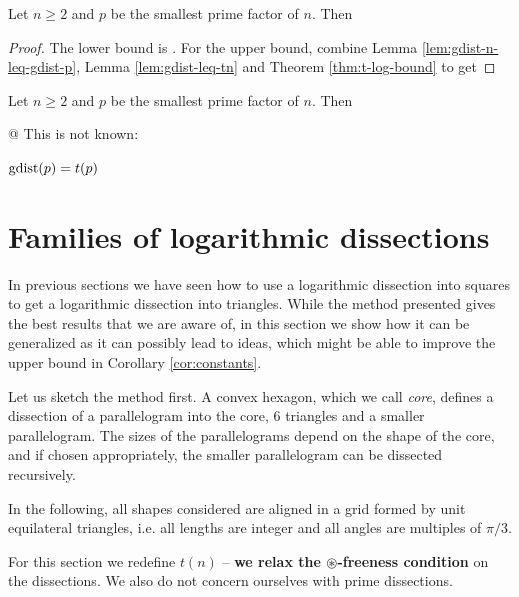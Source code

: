 
\begin{cor}
\label{cor:conj-proof}
Let $n \geq 2$ and $p$ be the smallest prime factor of $n$. Then
\end{cor}%
\begin{proof}
The lower bound is . For the upper bound, combine Lemma \ref{lem:gdist-n-leq-gdist-p}, Lemma \ref{lem:gdist-leq-tn} and Theorem \ref{thm:t-log-bound} to get
\end{proof}

\begin{cor}
\label{cor:constants}
Let $n \geq 2$ and $p$ be the smallest prime factor of $n$. Then
\end{cor}%

@ This is not known:

\begin{conj}
\label{conj:gdistp-equals-tp}
$\mathop{\mathrm{gdist}}(p) = t(p)$
\end{conj}%


\section{Families of logarithmic dissections}
\label{sec:other-log-dissections}

In previous sections we have seen how to use a logarithmic dissection into squares to get a logarithmic dissection into triangles. While the method presented gives the best results that we are aware of, in this section we show how it can be generalized as it can possibly lead to ideas, which might be able to improve the upper bound in Corollary \ref{cor:constants}.

Let us sketch the method first. A convex hexagon, which we call \emph{core}, defines a dissection of a parallelogram into the core, 6 triangles and a smaller parallelogram. The sizes of the parallelograms depend on the shape of the core, and if chosen appropriately, the smaller parallelogram can be dissected recursively.

In the following, all shapes considered are aligned in a grid formed by unit equilateral triangles, i.e. all lengths are integer and all angles are multiples of $\pi/3$.

For this section we redefine $t(n)$ -- \textbf{we relax the $\circledast$-freeness condition} on the dissections. We also do not concern ourselves with prime dissections.


